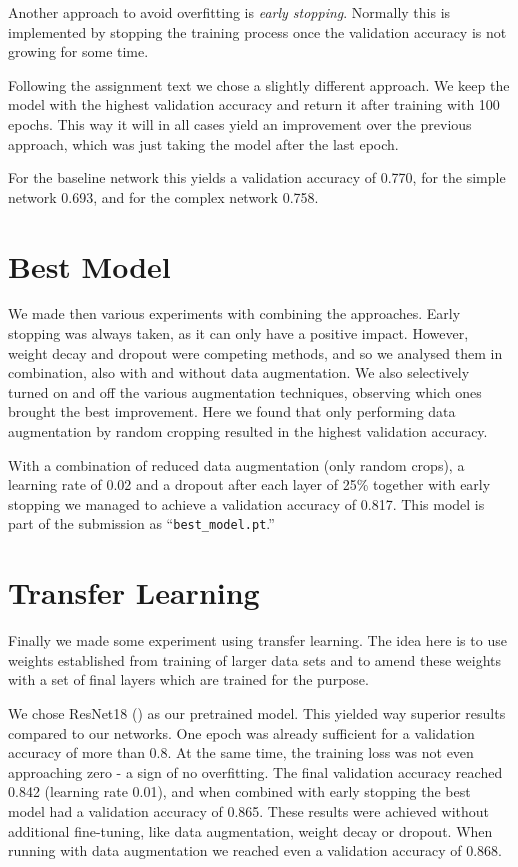 \documentclass[sigconf,nonacm]{acmart}
\begin{document}
Another approach to avoid overfitting is \emph{early stopping}.
Normally this is implemented by stopping the training process
once the validation accuracy is not growing for some time.

Following the assignment text we chose a slightly different
approach.
We keep the model with the highest validation accuracy 
and return it after training with 100 epochs.
This way it will in all cases yield an improvement over
the previous approach, which was just taking the model
after the last epoch.

For the baseline network this yields a validation accuracy
of 0.770, for the simple network 0.693, and for the
complex network 0.758.

\section{Best Model}

We made then various experiments with combining the
approaches.
Early stopping was always taken, as it can only have
a positive impact.
However, weight decay and dropout were competing
methods, and so we analysed them in combination,
also with and without data augmentation.
We also selectively turned on
and off the various augmentation techniques,
observing which ones brought the best improvement.
Here we found that only performing data augmentation
by random cropping resulted in the highest validation
accuracy.

With a combination of reduced data augmentation (only random
crops), a learning rate of 0.02 and
a dropout after each layer of 25\% 
together with early stopping
we managed to achieve a validation accuracy of 0.817.
This model is part of the submission as ``\texttt{best\_model.pt}.''

\section{Transfer Learning}

Finally we made some experiment using transfer
learning.
The idea here is to use weights established from training
of larger data sets and to amend these weights with
a set of final layers which are trained for the purpose.

We chose ResNet18 (\cite{resnet2015}) as our pretrained
model.
This yielded way superior results compared to our networks.
One epoch was already sufficient for a validation accuracy
of more than 0.8.
At the same time, the training loss was not even approaching
zero - a sign of no overfitting.
The final validation accuracy reached 0.842 (learning
rate 0.01), and when combined with early stopping the best
model had a validation accuracy of 0.865.
These results were achieved without additional fine-tuning, like
data augmentation, weight decay or dropout.
When running with data augmentation we reached even
a validation accuracy of 0.868.
\end{document}
